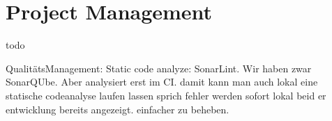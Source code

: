 \section{Project Management}
todo


QualitätsManagement: Static code analyze: SonarLint. \cite{sonar-lint}
Wir haben zwar SonarQUbe. Aber analysiert erst im CI.
damit kann man auch lokal eine statische codeanalyse laufen lassen sprich fehler werden sofort lokal beid er
entwicklung bereits angezeigt. einfacher zu beheben. 
